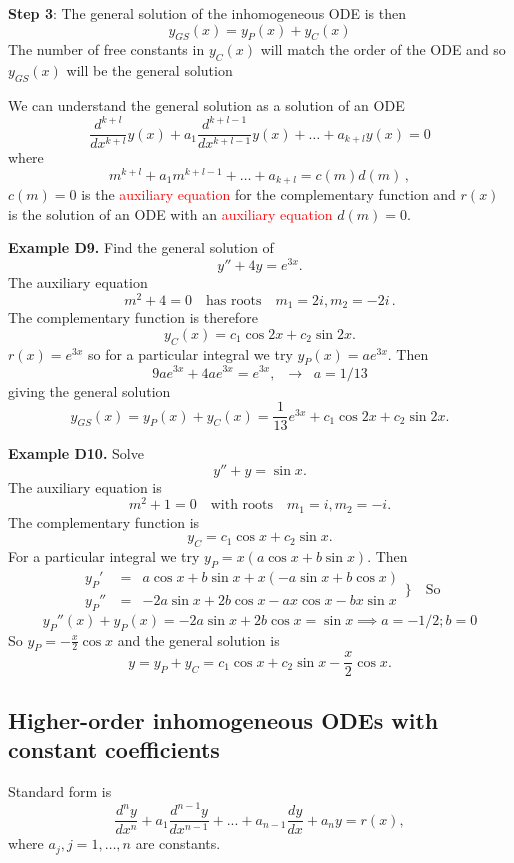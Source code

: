 \documentclass{article}
\begin{document}
\textbf{Step 3}: The general solution of the inhomogeneous ODE is then
$$
y_{GS} (x)=y_P (x) + y_C (x)
$$
The number of free constants in $y_C (x)$ will match the order of the ODE and so $y_{GS} (x)$ will be the general solution

We can understand the general solution as a solution of an ODE
$$
\frac{d^{k+l}}{dx^{k+l}} y(x) + a_1 \frac{d^{k+l - 1}}{dx^{k+l-1}} y(x) + \ldots + a_{k+l} y(x) = 0
$$
where
{\small 
$$
m^{k+l} +a_1 m^{k+l-1} + \ldots + a_{k+l}  = c(m) d(m)\,,
$$
}
$c(m) = 0$ is the \textcolor{red}{auxiliary equation} for the complementary function and $r(x)$ is the solution of
an ODE with an \textcolor{red}{auxiliary equation} $d(m) = 0$.

\hrulefill

\textbf{Example D9.} Find the general solution of
$$
y''+ 4 y= e^{3x}.
$$
The auxiliary equation
$$
m^2+4=0 \quad \mbox{has roots} \quad 
m_1=2i, m_2=-2i\,.
$$
The complementary function is therefore
$$
y_C (x)=c_1 \cos 2 x + c_2 \sin 2 x.
$$
$r(x) = e^{3x}$ so for a particular integral we try $ y_P (x) = a e^{ 3x}$. Then 
$$
9 a e^{3x} + 4 a e^{3x} = e^{3 x}, \;\; \to \;\; a =1/13
$$
giving the general solution
$$
y_{GS} (x) =y_P (x) + y_C (x) = \frac{1}{13} e^{3 x} + c_1 \cos 2 x + c_2 \sin 2 x.
$$

\hrulefill

\textbf{Example D10.} Solve
{\small
$$
y''+  y= \sin x.
$$
}
The auxiliary equation is
{\small
$$
m^2+1=0 \quad \mbox{with roots} \quad m_1=i, m_2=-i.
$$
}
The complementary function is
$$
y_C=c_1 \cos  x + c_2 \sin  x.
$$
For a particular integral we try $y_P=x( a \cos x + b \sin x)$. Then
{\small
$$
\begin{array}{lll}
y_P' & = & a \cos x + b \sin x + x( -a \sin x + b \cos x)\\
y_P''\ & = & -2a \sin x + 2b \cos x  -a x \cos x - b x \sin x
\end{array} \rbrace \quad \mbox{So}
$$
}
{\small 
$$
y_P''(x) + y_P (x) = -2a \sin x + 2 b \cos x = \sin x \implies a= -1/2; b=0
$$
}
So $y_P= -\frac{x}{2} \cos x$ and the general solution is
$$
y=y_P+ y_C=  c_1 \cos  x + c_2 \sin  x  -\frac{x}{2} \cos x.
$$


\subsection{Higher-order inhomogeneous ODEs with constant coefficients} 

Standard form is
$$
\frac{d^n y}{dx^n} + a_1 \frac{d^{n-1} y}{dx^{n-1}}+...+ a_{n-1}
\frac{d y}{dx}+  a_n y= r(x),
$$
where $ a_j, j=1, \ldots , n$ are  constants.
\end{document}
